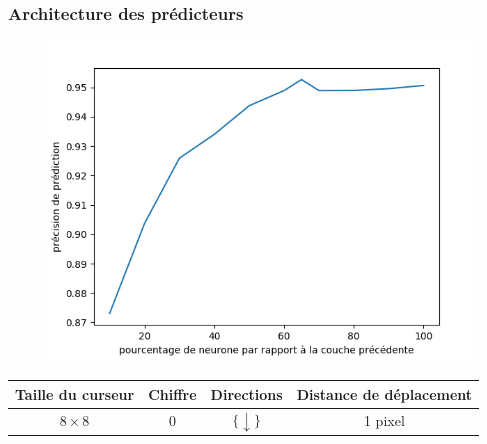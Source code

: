 \documentclass{beamer}
\begin{document}
\begin{frame}
    \frametitle{Architecture des prédicteurs}
    \begin{figure}
        \includegraphics[height=0.5\textheight]{arch_acc.png}
    \end{figure}
    \center
    \fontsize{7pt}{7}\selectfont
    \begin{tabu}{|c|c|c|c|}\hline
        Taille du curseur & Chiffre & Directions & Distance de déplacement \\ \hline
        $8 \times 8$ & 0 & $\{\downarrow\}$ & 1 pixel \\ \hline
    \end{tabu}
\end{frame}
\end{document}
